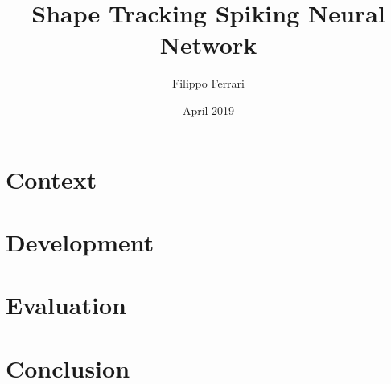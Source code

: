 \documentclass[12pt]{report}
\title{Shape Tracking Spiking Neural Network}
\author{Filippo Ferrari}
\date{April 2019}
\begin{document}






\tableofcontents

\listoffigures


\chapter{Context}

\newpage

\chapter{Development}

\newpage

\chapter{Evaluation}

\newpage

\chapter{Conclusion}

\newpage

% 

%

\printbibliography[heading=bibintoc]
\end{document}
